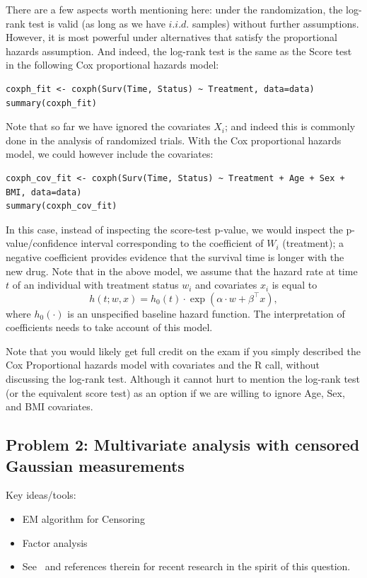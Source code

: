 There are a few aspects worth mentioning here: under the randomization, the log-rank test is valid (as long as we have $i.i.d.$ samples) without further assumptions. However, it is most powerful under alternatives that satisfy the proportional hazards assumption. And indeed, the log-rank test is the same as the Score test in the following Cox proportional hazards model:
\begin{lstlisting}
coxph_fit <- coxph(Surv(Time, Status) ~ Treatment, data=data)
summary(coxph_fit)
\end{lstlisting} 
Note that so far we have ignored the covariates $X_i$; and indeed this is commonly done in the analysis of randomized trials. With the Cox proportional hazards model, we could however include the covariates:

\begin{lstlisting}
coxph_cov_fit <- coxph(Surv(Time, Status) ~ Treatment + Age + Sex + BMI, data=data)
summary(coxph_cov_fit)
\end{lstlisting} 
In this case, instead of inspecting the score-test p-value, we would inspect the p-value/confidence interval corresponding to the coefficient of $W_i$ (treatment); a negative coefficient provides evidence that the survival time is longer with the new drug. Note that in the above model, we assume that the hazard rate at time $t$ of an individual with treatment status $w_i$ and covariates $x_i$ is equal to
$$ h(t; w,x) = h_0(t)\cdot \exp( \alpha \cdot w + \beta^\top x), $$
where $h_0(\cdot)$ is an unspecified baseline hazard function. The interpretation of coefficients needs to take account of this model.

Note that you would likely get full credit on the exam if you simply described the Cox Proportional hazards model with covariates and the R call, without discussing the log-rank test. Although it cannot hurt to mention the log-rank test (or the equivalent score test) as an option if we are willing to ignore Age, Sex, and BMI covariates.

\subsection*{Problem 2: Multivariate analysis with censored Gaussian measurements}


Key ideas/tools:
\begin{itemize}
  \item EM algorithm for Censoring
  \item Factor analysis
  \item See~\citet*{augugliaro2020} and references therein for recent research in the spirit of this question.
\end{itemize}

